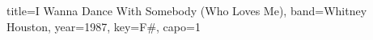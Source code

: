 \documentclass{../../tex/bekki-leadsheet}
\begin{document}
\begin{song}[transpose-capo=true]{title={I Wanna Dance With Somebody (Who Loves Me)}, band={Whitney Houston}, year={1987}, key={F#}, capo={1}}

  

\end{song}
\end{document}
